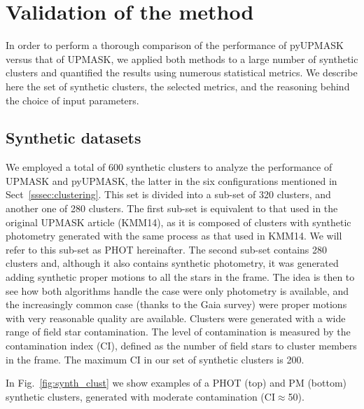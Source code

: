 \documentclass{aa}
\begin{document}
\section{Validation of the method}
 \label{sec:validation}

 In order to perform a thorough comparison of the performance of pyUPMASK
 versus that of UPMASK, we applied both methods to a large number of synthetic
 clusters and quantified the results using numerous statistical metrics.
 We describe here the set of synthetic clusters, the selected metrics, and the
 reasoning behind the choice of input parameters.



\subsection{Synthetic datasets}
 \label{ssec:synthetic}

 We employed a total of 600 synthetic clusters to analyze the performance of
 UPMASK and pyUPMASK, the latter in the six configurations mentioned in
 Sect~\ref{sssec:clustering}. This set is divided into a sub-set of 320
 clusters, and another one of 280 clusters. The first sub-set is equivalent to
 that used in the original UPMASK article (KMM14), as it is composed of
 clusters with synthetic photometry generated with the same process as that
 used in KMM14. We will refer to this sub-set as PHOT hereinafter.
 The second sub-set contains 280 clusters and, although it also contains
 synthetic photometry, it was generated adding synthetic proper motions to all
 the stars in the frame.
 The idea is then to see how both algorithms handle the case were only
 photometry is available, and the increasingly common case (thanks to the Gaia
 survey) were proper motions with very reasonable quality are available.
 Clusters were generated with a wide range of field star contamination.
 The level of contamination is measured by the contamination index (CI),
 defined as the number of field stars to cluster members in the frame. The
 maximum CI in our set of synthetic clusters is 200.

 In Fig.~\ref{fig:synth_clust} we show examples of a PHOT (top) and PM
 (bottom) synthetic clusters, generated with moderate contamination 
 (CI$\approx$50).
\end{document}
